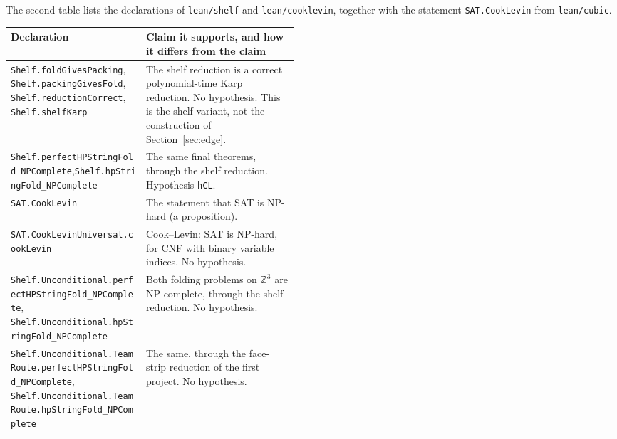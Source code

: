 \documentclass[11pt,letterpaper]{article}
\theoremstyle{definition}
\theoremstyle{remark}
\newcommand{\lean}[1]{\texttt{#1}}
\newcommand{\Z}{\mathbb{Z}}
\begin{document}
\noindent The second table lists the declarations of \lean{lean/shelf} and \lean{lean/cooklevin},
together with the statement \lean{SAT.CookLevin} from \lean{lean/cubic}.
\begin{center}\footnotesize
\begin{tabularx}{\linewidth}{@{}>{\raggedright\arraybackslash}p{0.47\linewidth}>{\raggedright\arraybackslash}X@{}}
\toprule
Declaration & Claim it supports, and how it differs from the claim\\
\midrule
\lean{Shelf.foldGivesPacking}, \lean{Shelf.packingGivesFold}, \lean{Shelf.reductionCorrect},
  \lean{Shelf.shelfKarp} & The shelf reduction is a correct polynomial-time Karp reduction. No
  hypothesis. This is the shelf variant, not the construction of Section~\ref{sec:edge}.\\
\lean{Shelf.perfectHPStringFold\_NPComplete},\newline \lean{Shelf.hpStringFold\_NPComplete} & The same
  final theorems, through the shelf reduction. Hypothesis \lean{hCL}.\\
\lean{SAT.CookLevin} & The statement that SAT is NP-hard (a proposition).\\
\lean{SAT.CookLevinUniversal.cookLevin} & Cook--Levin: SAT is NP-hard, for CNF with binary variable
  indices. No hypothesis.\\
\lean{Shelf.Unconditional.\allowbreak perfectHPStringFold\_NPComplete},\newline
  \lean{Shelf.Unconditional.\allowbreak hpStringFold\_NPComplete} & Both folding problems on $\Z^3$ are
  NP-complete, through the shelf reduction. No hypothesis.\\
\lean{Shelf.Unconditional.TeamRoute.\allowbreak perfectHPStringFold\_NPComplete},\newline
  \lean{Shelf.Unconditional.TeamRoute.\allowbreak hpStringFold\_NPComplete} & The same, through the
  face-strip reduction of the first project. No hypothesis.\\
\bottomrule
\end{tabularx}
\end{center}
\end{document}
